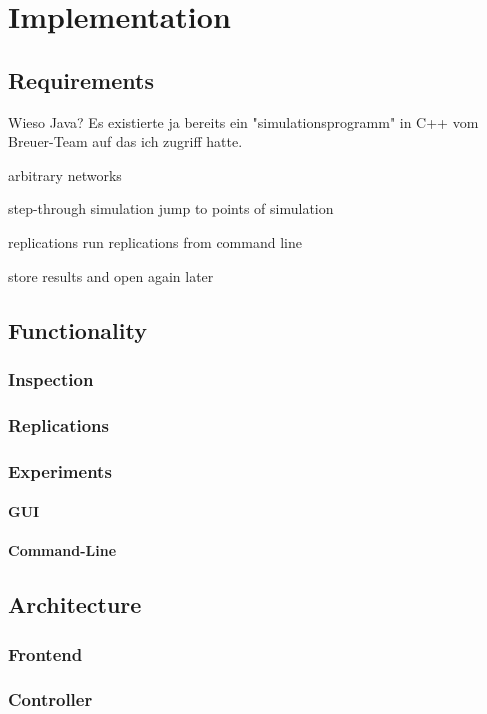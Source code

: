 \documentclass[Bachelorarbeit.tex]{subfiles}
\begin{document}
\chapter{Implementation}
\label{ch:implementation}

\section{Requirements}
Wieso Java? Es existierte ja bereits ein "simulationsprogramm" in C++ vom Breuer-Team auf das ich zugriff hatte.

arbitrary networks

step-through simulation
jump to points of simulation

replications
run replications from command line

store results and open again later

\section{Functionality}

\subsection{Inspection}

\subsection{Replications}

\subsection{Experiments}
\subsubsection{GUI}
\subsubsection{Command-Line}

\section{Architecture}
\subsection{Frontend}
\subsection{Controller}
\end{document}
